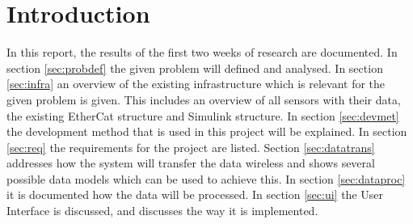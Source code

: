 \section{Introduction}
In this report, the results of the first two weeks of research are documented. In section \ref{sec:probdef} the given problem will defined and analysed. In section \ref{sec:infra} an overview of the existing infrastructure which is relevant for the given problem is given. This includes an overview of all sensors with their data, the existing EtherCat structure and Simulink structure. In section \ref{sec:devmet} the development method that is used in this project will be explained. In section \ref{sec:req} the requirements for the project are listed. Section \ref{sec:datatrans} addresses how the system will transfer the data wireless and shows several possible data models which can be used to achieve this. In section \ref{sec:dataproc} it is documented how the data will be processed. In section \ref{sec:ui} the User Interface is discussed, and discusses the way it is implemented. 
